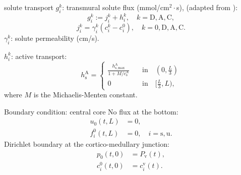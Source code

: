 \documentclass{beamer}
\begin{document}
\begin{frame}{solute transport}
    $g_i^k$: transmural solute flux (mmol/$\text{cm}^2\cdot$s), (adapted from \cite{Stephenson1987,Stephenson1989}):
    \begin{equation}
        g_i^k := j_i^k+h_i^k,\quad k=\mathrm{D},\mathrm{A},\mathrm{C},
    \end{equation}
    \begin{equation}
        j_i^k = \gamma_i^k\left( c_i^k - c_i^0 \right),\quad k=0,\mathrm{D},\mathrm{A},\mathrm{C}.
    \end{equation}
    $\gamma_i^k$: solute permeability (cm/s).

    $h_i^k$: active transport:
    \begin{equation}
        h_\mathrm{s}^\mathrm{A} = \begin{cases}
            \frac{{h}_\mathrm{s,max}^\mathrm{A}}{1+{M}/{c}_\mathrm{s}^\mathrm{A}}\quad &\text{in}\quad (0,\frac{L}{3})\\
            0\quad &\text{in}\quad [\frac{L}{3},L),
        \end{cases}
    \end{equation}
    where $M$ is the Michaelis-Menten constant.
\end{frame}

\begin{frame}{Boundary condition: central core}
    No flux at the bottom:
    \begin{align}
        u_0(t,L) &= 0,\\ 
        f_i^0(t,L)&=0,\quad i=\mathrm{s},\mathrm{u}.
    \end{align}
    Dirichlet boundary at the cortico-medullary junction:
    \begin{align}
        p_0(t,0) &= P_\mathrm{v}(t),\\ 
        c_i^0(t,0) &= c_i^\mathrm{v}(t).
    \end{align}
\end{frame}
\end{document}
